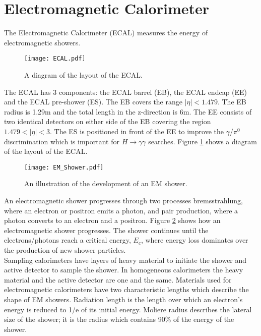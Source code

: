 \section{Electromagnetic Calorimeter}

The Electromagnetic Calorimeter (ECAL) measures the energy of electromagnetic 
showers. \\

\begin{figure}
\begin{center}
\texttt{[image: ECAL.pdf]}
\end{center}
\caption{A diagram of the layout of the ECAL.}
\label{fig:ECAL}
\end{figure}

The ECAL has 3 components: the ECAL barrel (EB), the ECAL endcap (EE) and the
ECAL pre-shower (ES). The EB covers the range $|\eta| < 1.479$. The EB radius is
1.29m and the total length in the z-direction is 6m. The EE consists of two 
identical detectors on either side of the EB covering the region $1.479 < |\eta|
< 3$. The ES is positioned in front of the EE to improve the $\gamma$/$\pi^{0}$ 
discrimination which is important for $H\rightarrow\gamma\gamma$ searches. 
Figure \ref{fig:ECAL} shows a diagram of the layout of the ECAL. \\

\begin{figure}
\begin{center}
\texttt{[image: EM\_Shower.pdf]}
\end{center}
\caption{An illustration of the development of an EM shower.}
\label{fig:em_shower}
\end{figure}

An electromagnetic shower progresses through two processes bremsstrahlung,
where an electron or positron emits a photon, and pair production, where a
photon converts to an electron and a positron. Figure \ref{fig:em_shower} shows
how an electromagnetic shower progresses. The shower continues until the
electrons/photons reach a critical energy, $E_{c}$, where energy loss dominates
over the production of new shower particles. \\

Sampling calorimeters have layers of heavy material to initiate the shower and 
active detector to sample the shower. In homogeneous calorimeters the 
heavy material and the active detector are one and the same. Materials used for
electromagnetic calorimeters have two characteristic lengths which describe the 
shape of EM showers. Radiation length is the length over which an electron's 
energy is reduced to 1/e of its initial energy. Moliere radius describes the 
lateral size of the shower; it is the radius which contains 90\% of the energy 
of the shower. \\  

